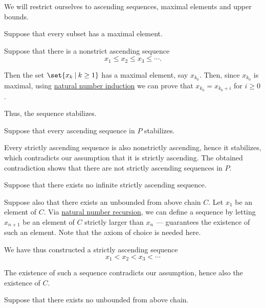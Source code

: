 \begin{defproof}
  We will restrict ourselves to ascending sequences, maximal elements and upper bounds.

   Suppose that every subset has a maximal element.

  Suppose that there is a nonstrict ascending sequence
  \begin{equation*}
    x_1 \leq x_2 \leq x_3 \leq \cdots.
  \end{equation*}

  Then the set \( \set{ x_k \given k \geq 1 } \) has a maximal element, say \( x_{k_0} \). Then, since \( x_{k_0} \) is maximal, using \hyperref[con:induction/peano_arithmetic]{natural number induction} we can prove that \( x_{k_0} = x_{k_0 + i} \) for \( i \geq 0 \).

  Thus, the sequence stabilizes.

   Suppose that every ascending sequence in \( P \) stabilizes.

  Every strictly ascending sequence is also nonstrictly ascending, hence it stabilizes, which contradicts our assumption that it is strictly ascending. The obtained contradiction shows that there are not strictly ascending sequences in \( P \).

   Suppose that there exists no infinite strictly ascending sequence.

  Suppose also that there exists an unbounded from above chain \( C \). Let \( x_1 \) be an element of \( C \). Via \hyperref[rem:natural_number_recursion]{natural number recursion}, we can define a sequence by letting \( x_{n+1} \) be an element of \( C \) strictly larger than \( x_n \) ---  guarantees the existence of such an element. Note that the axiom of choice is needed here.

  We have thus constructed a strictly ascending sequence
  \begin{equation*}
    x_1 < x_2 < x_3 < \cdots
  \end{equation*}

  The existence of such a sequence contradicts our assumption, hence also the existence of \( C \).

   Suppose that there exists no unbounded from above chain.


\end{defproof}
